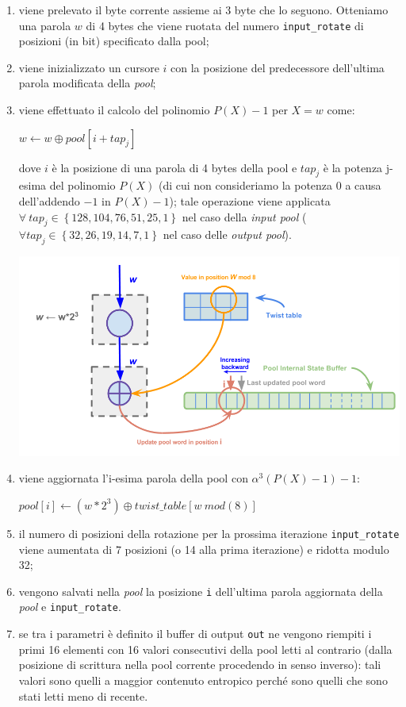 \documentclass{article}
\begin{document}
 \begin{enumerate}
   \item viene prelevato il byte corrente assieme ai 3 byte che lo seguono.
   Otteniamo una parola $w$ di 4 bytes che viene ruotata del numero
   \verb+input_rotate+ di posizioni (in bit) specificato dalla pool;
   \item viene inizializzato un cursore $i$ con la posizione del
   predecessore dell'ultima parola modificata della \emph{pool};
   \item viene effettuato il calcolo del polinomio $P(X)-1$ per $X=w$
   come:
   \begin{center}
   $w\leftarrow w \oplus pool[i + tap_j]$
   \end{center}
   dove $i$ è la posizione di una parola di 4 bytes della pool e $tap_j$ è la
   potenza j-esima del polinomio $P(X)$ (di cui non consideriamo la potenza 0
   a causa dell'addendo $-1$ in $P(X)-1$); tale operazione viene applicata 
   $\forall\ tap_j \in \left\{128, 104, 76, 51, 25, 1 \right\}$ nel caso della
   \emph{input pool} ($\forall tap_j \in \left\{32, 26, 19, 14, 7, 1 \right\}$
   nel caso delle \emph{output pool}).\\
   
           \centerline{\includegraphics[width=150mm]{img/mixing_function2.png}} 
   
   \item viene aggiornata l'i-esima parola della pool con 
   $\alpha^3\left(P(X)-1\right)-1$:
   \begin{center}
   $pool\left[i\right] \leftarrow  \left(w*2^3\right) \oplus
   twist\_table\left[w\ mod(8)\right]$
   \end{center}
   \item il numero di posizioni della rotazione per la prossima iterazione
   \verb+input_rotate+ viene aumentata di 7 posizioni (o 14 alla prima
   iterazione) e ridotta modulo 32;
   \item vengono salvati nella \emph{pool} la posizione \verb+i+ dell'ultima
   parola aggiornata della \emph{pool} e \verb+input_rotate+.
   \item se tra i parametri è definito il buffer di output \verb+out+ ne vengono
   riempiti i primi 16 elementi con 16 valori consecutivi della pool letti al
   contrario (dalla posizione di scrittura nella pool corrente procedendo in
   senso inverso): tali valori sono quelli a maggior contenuto entropico
   perché sono quelli che sono stati letti meno di recente.
 \end{enumerate}
\end{document}
